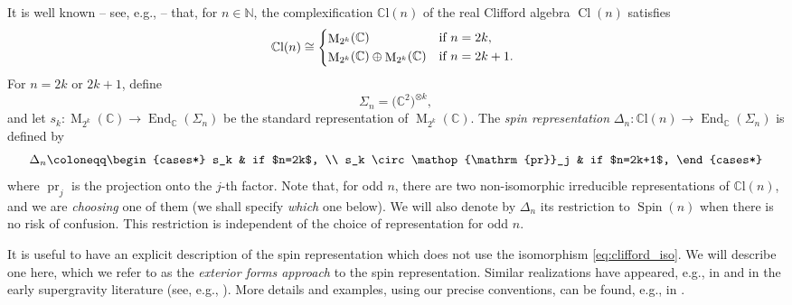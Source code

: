 \documentclass[pdftex]{sigma}
\numberwithin{equation}{section}
\newcommand{\N}{\mathbb{N}} %
\newcommand{\C}{\mathbb{C}} %
\DeclareMathOperator{\pr}{pr}
\DeclareMathOperator{\Spin}{Spin}
\DeclareMathOperator{\Cl}{Cl}
\DeclareMathOperator{\Mat}{M}
\DeclareMathOperator{\End}{End}
\begin{document}
		It is well known -- see, e.g., \cite{LM} -- that, for $n \in \N$, the complexification $\mathbb{C}\mathrm{l}(n)$ of the real Clifford algebra $\Cl(n)$ satisfies
		\begin{equation}\label{eq:clifford_iso}
			\mathbb{C}\mathrm{l}(n) \cong \begin{cases*} \Mat_{2^k} (\mathbb{C}) & if $n=2k$, \\
				\Mat_{2^k} (\mathbb{C}) \oplus \Mat_{2^k} (\mathbb{C}) & if $n=2k+1$.
			\end{cases*}
		\end{equation}
		For $n = 2k$ or $2k+1$, define
		\[ \Sigma_n = \bigl(\mathbb{C}^2\bigr)^{\otimes k} , \]
		and let $s_k \colon \Mat_{2^k} (\mathbb{C}) \to \End_{\C}(\Sigma_n)$ be the standard representation of $\Mat_{2^k} (\mathbb{C})$. The \textit{spin representation} $\Delta_n \colon \mathbb{C}\mathrm{l}(n) \to \End_{\mathbb{C}}(\Sigma_n)$ is defined by
		\begin{equation*}
			\Delta_n \coloneqq \begin{cases*} s_k & if $n=2k$, \\
				s_k \circ \pr_j & if $n=2k+1$,
			\end{cases*}
		\end{equation*}
		where $\pr_j$ is the projection onto the $j$-th factor. Note that, for odd $n$, there are two non-isomorphic irreducible representations of $\C \mathrm{l} (n)$, and we are \textit{choosing} one of them (we shall specify \textit{which} one below). We will also denote by $\Delta_n$ its restriction to $\Spin(n)$ when there is no risk of confusion. This restriction is independent of the choice of representation for odd $n$.
		
		It is useful to have an explicit description of the spin representation which does not use the isomorphism \eqref{eq:clifford_iso}. We will describe one here, which we refer to as the \textit{exterior forms approach} to the spin representation. Similar realizations have appeared, e.g., in \cite{GW09,LM} and in the early supergravity literature (see, e.g., \cite{Gillard_2005}). More details and examples, using our precise conventions, can be found, e.g., in \cite{AHL,jordansasakian}.
		
\end{document}
